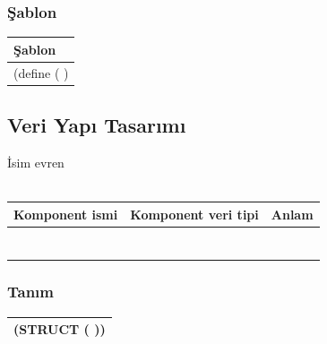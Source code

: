 \documentclass[12pt, a4paper]{article}
\newcommand\fillin[1][3cm]{\makebox[#1]{\dotfill}}
\begin{document}
\subsubsection*{Şablon}
\begin{tabular}{| p{17cm} |  }
\hline			
Şablon\\
\hline
\vspace{0,2cm}
(define (\fillin[2cm] \hspace{1cm}  \fillin[8cm] ) \\[30ex]
\hline  
\end{tabular}






\newpage
\subsection*{Veri Yapı Tasarımı}
İsim evren\\
\vspace{0.5cm}\\
\begin{tabular}{| p{4cm} | p{4cm} | p{8cm} |  }
\hline			
Komponent ismi&Komponent veri tipi&Anlam\\
\hline
& & \\[10ex]
\hline  
& & \\[10ex]
\hline  
& & \\[10ex]
\hline  
& & \\[10ex]
\hline  
& & \\[10ex]
\hline  
& & \\[10ex]
\hline  
& & \\[10ex]
\hline  
\end{tabular}

\subsubsection*{Tanım}
\begin{tabular}{| p{17cm} |  }
\hline			
\vspace{0.5cm}
(STRUCT \fillin[3cm] (\fillin[10cm] ))\\[10ex]
\hline
\end{tabular}


\end{document}
